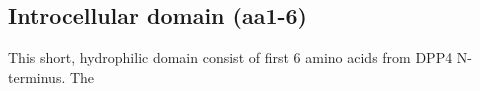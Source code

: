\subsection{Introcellular domain (aa1-6)}

This short, hydrophilic domain consist of first 6 amino acids from DPP4 N-terminus. The 